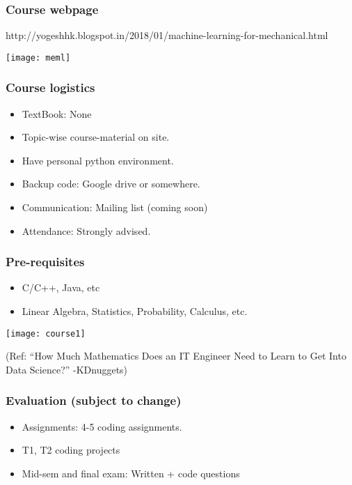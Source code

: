 \begin{frame}[fragile]\frametitle{Course webpage}
http://yogeshhk.blogspot.in/2018/01/machine-learning-for-mechanical.html
\begin{center}
\texttt{[image: meml]}
\end{center}
\end{frame}

\begin{frame}[fragile]\frametitle{Course logistics}
\begin{itemize}
\item TextBook: None
\item Topic-wise course-material on site.
\item Have personal python environment.
\item Backup code: Google drive or somewhere.
\item Communication: Mailing list (coming soon)
\item Attendance: Strongly advised.
\end{itemize}
\end{frame}


\begin{frame}[fragile]\frametitle{Pre-requisites}
\begin{itemize}
\item C/C++, Java, etc
\item Linear Algebra, Statistics, Probability, Calculus, etc.
\end{itemize}
\begin{center}
\texttt{[image: course1]}
\end{center}
{\tiny (Ref: ``How Much Mathematics Does an IT Engineer Need to Learn to Get Into Data Science?'' -KDnuggets)}
\end{frame}

\begin{frame}[fragile]\frametitle{Evaluation (subject to change)}
\begin{itemize}
\item Assignments: 4-5 coding assignments. 
\item T1, T2 coding projects
\item Mid-sem and final exam: Written + code questions
\end{itemize}
\end{frame}


